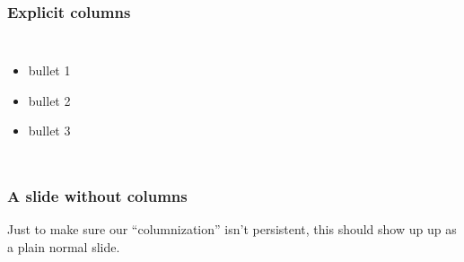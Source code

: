 \documentclass[t,english]{beamer}
\begin{document}
\begin{frame}[fragile]
\frametitle{Explicit columns}

\begin{columns}[T]

\noindent{}

\begin{itemize}[<+-| alert@+>]

\item bullet 1

\item bullet 2

\item bullet 3
\end{itemize}

\end{columns}
\end{frame}

\begin{frame}[fragile]
\frametitle{A slide without columns}


Just to make sure our ``columnization'' isn't persistent, this should show up
up as a plain normal slide.
\end{frame}
\end{document}
